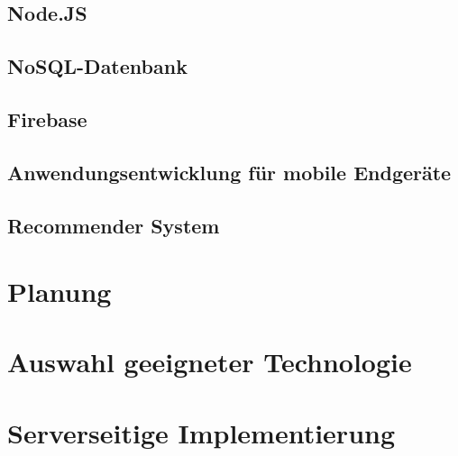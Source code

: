 \documentclass[11pt,a4paper]{article}
\begin{document}
\clearpage
\subsection{Node.JS}

%

\clearpage
\subsection{NoSQL-Datenbank}
\label{sec:nosql}

\clearpage
\subsection{Firebase}
\label{sec:firebase}

\subsection{Anwendungsentwicklung für mobile Endgeräte}

\subsection{Recommender System}
\label{sec:recomandationSystem}


\clearpage
\section{Planung}
\label{sec:concept}



\clearpage
\section{Auswahl geeigneter Technologie}


\clearpage
\section{Serverseitige Implementierung}

\end{document}
